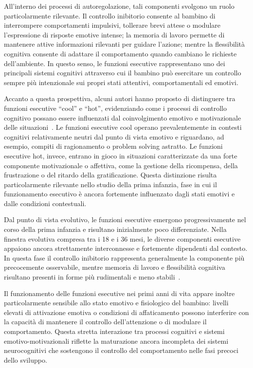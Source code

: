         All'interno dei processi di autoregolazione, tali componenti svolgono un ruolo particolarmente rilevante. Il controllo inibitorio consente al bambino di interrompere comportamenti impulsivi, tollerare brevi attese o modulare l'espressione di risposte emotive intense; la memoria di lavoro permette di mantenere attive informazioni rilevanti per guidare l'azione; mentre la flessibilità cognitiva consente di adattare il comportamento quando cambiano le richieste dell'ambiente. In questo senso, le funzioni esecutive rappresentano uno dei principali sistemi cognitivi attraverso cui il bambino può esercitare un controllo sempre più intenzionale sui propri stati attentivi, comportamentali ed emotivi.

        Accanto a questa prospettiva, alcuni autori hanno proposto di distinguere tra funzioni esecutive ``cool'' e ``hot'', evidenziando come i processi di controllo cognitivo possano essere influenzati dal coinvolgimento emotivo e motivazionale delle situazioni~\cite{zelazo2012}. Le funzioni esecutive cool operano prevalentemente in contesti cognitivi relativamente neutri dal punto di vista emotivo e riguardano, ad esempio, compiti di ragionamento o problem solving astratto. Le funzioni esecutive hot, invece, entrano in gioco in situazioni caratterizzate da una forte componente motivazionale o affettiva, come la gestione della ricompensa, della frustrazione o del ritardo della gratificazione. Questa distinzione risulta particolarmente rilevante nello studio della prima infanzia, fase in cui il funzionamento esecutivo è ancora fortemente influenzato dagli stati emotivi e dalle condizioni contestuali.

        Dal punto di vista evolutivo, le funzioni esecutive emergono progressivamente nel corso della prima infanzia e risultano inizialmente poco differenziate. Nella finestra evolutiva compresa tra i 18 e i 36 mesi, le diverse componenti esecutive appaiono ancora strettamente interconnesse e fortemente dipendenti dal contesto. In questa fase il controllo inibitorio rappresenta generalmente la componente più precocemente osservabile, mentre memoria di lavoro e flessibilità cognitiva risultano presenti in forme più rudimentali e meno stabili~\cite{diamond2013}.

        Il funzionamento delle funzioni esecutive nei primi anni di vita appare inoltre particolarmente sensibile allo stato emotivo e fisiologico del bambino: livelli elevati di attivazione emotiva o condizioni di affaticamento possono interferire con la capacità di mantenere il controllo dell'attenzione o di modulare il comportamento. Questa stretta interazione tra processi cognitivi e sistemi emotivo-motivazionali riflette la maturazione ancora incompleta dei sistemi neurocognitivi che sostengono il controllo del comportamento nelle fasi precoci dello sviluppo.

